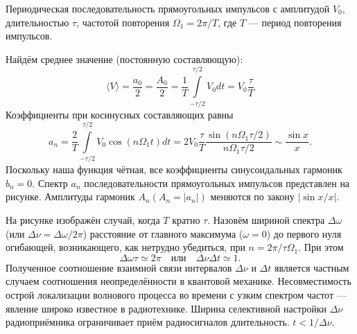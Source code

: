 \documentclass[a4paper, fontsize=14pt]{article}
\begin{document}
Периодическая последовательность прямоугольных импульсов с амплитудой $V_0$, длительностью $\tau$, частотой повторения $\Omega_1 = 2 \pi / T$, где $T$ --- период повторения импульсов.

Найдём среднее значение (постоянную составляющую):
\[
	\langle V\rangle=\frac{a_{0}}{2}=\frac{A_{0}}{2}=\frac{1}{T} \int\limits_{-\tau / 2}^{\tau / 2} V_{0} d t=V_{0} \frac{\tau}{T}
\]
Коэффициенты при косинусных составляющих равны 
\[
	a_n = \frac{2}{T} \int\limits_{-\tau/2}^{\tau/2} V_0 \cos (n \Omega_1 t) dt = 2 V_0 \frac{\tau}{T} \frac{\sin (n \Omega_1 \tau / 2)}{n \Omega_1 \tau / 2} \sim \frac{\sin x}{x}.
\]
Поскольку наша функция чётная, все коэффициенты синусоидальных гармоник $b_n = 0$. Спектр $a_n$ последовательности прямоугольных импульсов представлен на рисунке. Амплитуды гармоник $A_n (A_n = |a_n|)$ меняются по закону $|\sin x / x|$.

На рисунке изображён случай, когда $T$ кратно $\tau$. Назовём шириной спектра $\Delta \omega$ (или $\Delta \nu = \Delta \omega / 2 \pi$) расстояние от главного максимума ($\omega = 0$) до первого нуля огибающей, возникающего, как нетрудно убедиться, при $n = 2 \pi / \tau \Omega_1$. При этом
\[
	\Delta \omega \tau \simeq 2 \pi \quad \text{или} \quad \Delta \nu \Delta t \simeq 1.
\]
Полученное соотношение взаимной связи интервалов $\Delta \nu$ и $\Delta t$ является частным случаем соотношения неопределённости в квантовой механике. Несовместимость острой локализации волнового процесса во времени с узким спектром частот --- явление широко известное в радиотехнике. Ширина селективной настройки $\Delta \nu$ радиоприёмника ограничивает приём радиосигналов длительность. $t < 1 / \Delta \nu$.
\end{document}
